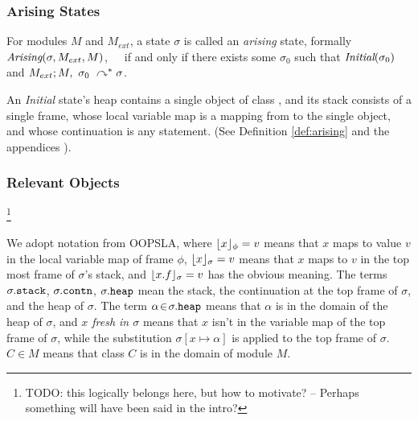 \subsubsection{Arising States}

\begin{definition}
\label{def:arising}
For   modules $M$ and  $M_{ext}$, a %
 state $\sigma$ is 
called an \emph{arising} state, formally \ \ \ $\textit{Arising}(\sigma, M_{ext}, M)$,\ \ \ 
if and only if there exists some $\sigma_0$ such that $\textit{Initial}(\sigma_0)$ and
$M_{ext} ; M,\ \sigma_0\ \curvearrowright^* \sigma$.
\end{definition}


An \emph{Initial} state's heap contains a single object of class , and
its  stack   consists of a single frame, whose local variable map is a
mapping from \prg{this} to the single object, and whose continuation is  any statement.
(See Definition %
\ref{def:arising} and the 
{appendices %
\cite{necessityFull}).}

\subsubsection{{Relevant  Objects}}

\footnote{{TODO: this logically belongs here,  but how to motivate? -- Perhaps something will have been said in the intro?}}


We adopt notation from OOPSLA, where
 $\lfloor x \rfloor_{\phi} = v$  means that $x$ maps to
value $v$ in the local variable map of frame $\phi$, $\lfloor x \rfloor_{\sigma} = v$ means that $x$ 
maps to $v$ in the top most frame of $\sigma$'s stack, and $\lfloor x.f \rfloor_{\sigma} = v$
has the obvious meaning. The terms $\sigma.{\texttt{stack}}$,  
$\sigma.{\texttt{contn}}$,  
$\sigma.{\texttt{heap}}$     mean the stack, 
the continuation at the
top frame of $\sigma$, %
and the heap of $\sigma$.
The term $\alpha\!\in\!\sigma.{\texttt{heap}}$ means that $\alpha$ is in the domain of the heap of $\sigma$, and \emph{$x$ fresh in $\sigma$} means that 
$x$ isn't in the variable map of the top frame of $\sigma$, 
while the substitution  $\sigma[x \mapsto \alpha]$ is applied to the top frame of $\sigma$.
 \ $C\in M$ means that class $C$ is in the domain of module $M$. 


